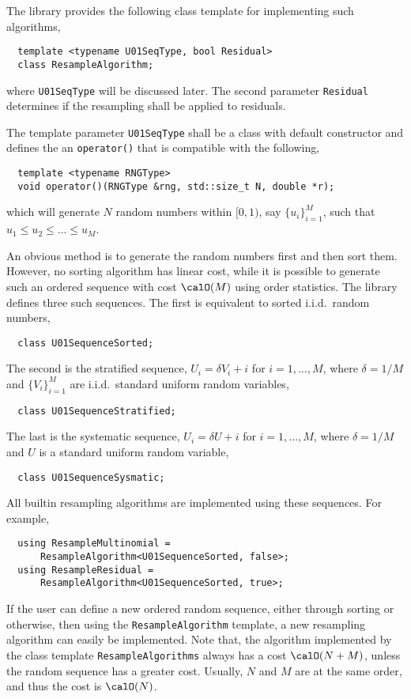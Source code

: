 The library provides the following class template for implementing such
algorithms,
\begin{Verbatim}
  template <typename U01SeqType, bool Residual>
  class ResampleAlgorithm;
\end{Verbatim}
where \verb|U01SeqType| will be discussed later. The second parameter
\verb|Residual| determines if the resampling shall be applied to residuals.

The template parameter \verb|U01SeqType| shall be a class with default
constructor and defines the an \verb|operator()| that is compatible with the
following,
\begin{Verbatim}
  template <typename RNGType>
  void operator()(RNGType &rng, std::size_t N, double *r);
\end{Verbatim}
which will generate $N$ random numbers within $[0, 1)$, say $\{u_i\}_{i=1}^M$,
such that $u_1 \le u_2 \le \dots \le u_M$.

An obvious method is to generate the random numbers first and then sort them.
However, no sorting algorithm has linear cost, while it is possible to generate
such an ordered sequence with cost $\calO(M)$ using order statistics. The
library defines three such sequences. The first is equivalent to sorted i.i.d.\
random numbers,
\begin{Verbatim}
  class U01SequenceSorted;
\end{Verbatim}
The second is the stratified sequence, $U_i = \delta V_i + i$ for $i =
1,\dots,M$, where $\delta = 1 / M$ and $\{V_i\}_{i=1}^M$ are i.i.d.\ standard
uniform random variables,
\begin{Verbatim}
  class U01SequenceStratified;
\end{Verbatim}
The last is the systematic sequence, $U_i = \delta U + i$ for $i = 1,\dots,M$,
where $\delta = 1 / M$ and $U$ is a standard uniform random variable,
\begin{Verbatim}
  class U01SequenceSysmatic;
\end{Verbatim}
All builtin resampling algorithms are implemented using these sequences. For
example,
\begin{Verbatim}
  using ResampleMultinomial =
      ResampleAlgorithm<U01SequenceSorted, false>;
  using ResampleResidual =
      ResampleAlgorithm<U01SequenceSorted, true>;
\end{Verbatim}
If the user can define a new ordered random sequence, either through sorting or
otherwise, then using the \verb|ResampleAlgorithm| template, a new resampling
algorithm can easily be implemented. Note that, the algorithm implemented by
the class template \verb|ResampleAlgorithms| always has a cost $\calO(N + M)$,
unless the random sequence has a greater cost. Usually, $N$ and $M$ are at the
same order, and thus the cost is $\calO(N)$.
